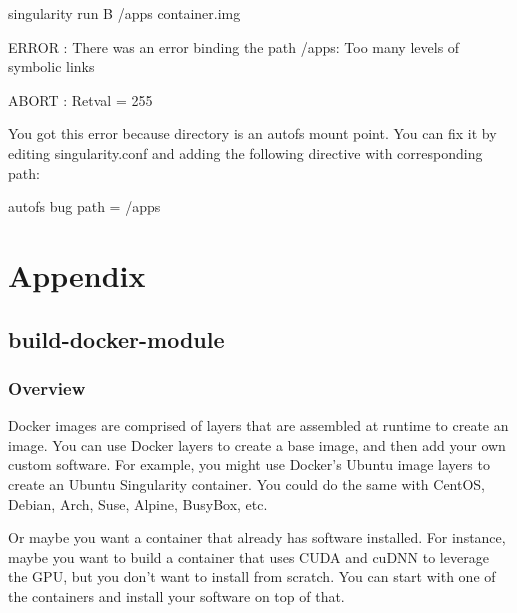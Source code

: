 \documentclass[letterpaper,10pt,english]{sphinxmanual}
\begin{document}
%
\begin{sphinxVerbatim}[commandchars=\\\{\}]
\PYGZdl{} singularity run \PYGZhy{}B /apps container.img

ERROR : There was an error binding the path /apps: Too many levels of symbolic links

ABORT : Retval = 255
\end{sphinxVerbatim}

You got this error because  directory is an autofs mount point. You
can fix it by editing singularity.conf and adding the following
directive with corresponding path:

%
\begin{sphinxVerbatim}[commandchars=\\\{\}]
autofs bug path = /apps
\end{sphinxVerbatim}


\chapter{Appendix}
\label{\detokenize{appendix:appendix}}\label{\detokenize{appendix::doc}}

\section{build-docker-module}
\label{\detokenize{appendix:build-docker-module}}\label{\detokenize{appendix:id1}}

\subsection{Overview}
\label{\detokenize{appendix:overview}}\label{\detokenize{appendix:sec-build-docker-module}}
Docker images are comprised of layers that are assembled at runtime to create an image. You can use Docker layers to create a base
image, and then add your own custom software. For example, you might use Docker’s Ubuntu image layers to create an Ubuntu Singularity
container. You could do the same with CentOS, Debian, Arch, Suse, Alpine, BusyBox, etc.

Or maybe you want a container that already has software installed. For instance, maybe you want to build a container that uses CUDA
and cuDNN to leverage the GPU, but you don’t want to install from scratch. You can start with one of the  containers and
install your software on top of that.
\end{document}
